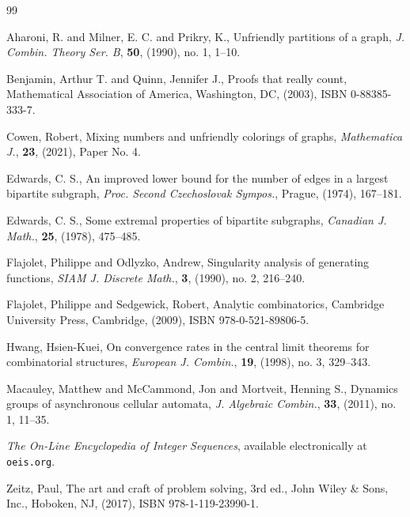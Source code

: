 \documentclass[11pt, reqno]{amsart}
\theoremstyle{definition}
\begin{document}


\begin{thebibliography}{99}

{Aharoni, R. and Milner, E. C. and Prikry, K.},
{Unfriendly partitions of a graph},
{\sl J. Combin. Theory Ser. B},
{\bf 50}, (1990), no. 1, {1--10}.

{Benjamin, Arthur T. and Quinn, Jennifer J.},
{Proofs that really count},
{Mathematical Association of America, Washington, DC},
(2003), ISBN {0-88385-333-7}.

{Cowen, Robert},
{Mixing numbers and unfriendly colorings of graphs},
{\sl Mathematica J.},
{\bf 23}, (2021), {Paper No. 4}.

{Edwards, C. S.},
{An improved lower bound for the number of edges in a largest
bipartite subgraph},
{\sl {P}roc. {S}econd {C}zechoslovak {S}ympos.},
{P}rague, (1974), {167--181}.

{Edwards, C. S.},
{Some extremal properties of bipartite subgraphs},
{\sl Canadian J. Math.},
{\bf 25}, (1978), {475--485}.

{Flajolet, Philippe and Odlyzko, Andrew},
{Singularity analysis of generating functions},
{\sl SIAM J. Discrete Math.},
{\bf 3}, (1990), no. 2, {216--240}.

{Flajolet, Philippe and Sedgewick, Robert},
{Analytic combinatorics},
{Cambridge University Press, Cambridge},
(2009), ISBN {978-0-521-89806-5}.

{Hwang, Hsien-Kuei},
{On convergence rates in the central limit theorems for
              combinatorial structures},
{\sl European J. Combin.},
{\bf 19}, (1998), no. 3, {329--343}.

{Macauley, Matthew and McCammond, Jon and Mortveit, Henning S.},
{Dynamics groups of asynchronous cellular automata},
{\sl J. Algebraic Combin.},
{\bf 33}, (2011), no. 1, {11--35}.

{\sl The On-Line Encyclopedia of Integer Sequences},
{available electronically at \texttt{oeis.org}}.

{Zeitz, Paul},
{The art and craft of problem solving}, 3rd ed.,
{John Wiley \& Sons, Inc., Hoboken, NJ},
(2017), ISBN {978-1-119-23990-1}.

\end{thebibliography}
\end{document}
